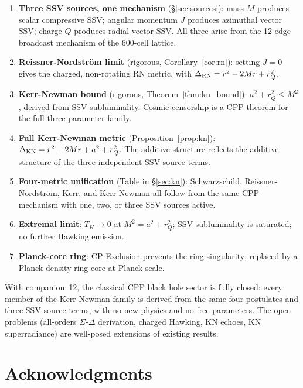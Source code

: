 \documentclass[12pt]{article}
\newcommand{\rQ}{r_Q}
\newcommand{\Dlt}{\Delta}
\begin{document}
\begin{enumerate}
  \item \textbf{Three SSV sources, one mechanism} (§\ref{sec:sources}):
    mass $M$ produces scalar compressive SSV; angular momentum $J$
    produces azimuthal vector SSV; charge $Q$ produces radial vector
    SSV.  All three arise from the 12-edge broadcast mechanism of the
    600-cell lattice.

  \item \textbf{Reissner-Nordström limit} (rigorous,
    Corollary~\ref{cor:rn}): setting $J = 0$ gives the charged,
    non-rotating RN metric, with $\Dlt_{\rm RN} = r^2 - 2Mr + \rQ^2$.

  \item \textbf{Kerr-Newman bound} (rigorous,
    Theorem~\ref{thm:kn_bound}): $a^2 + \rQ^2 \leq M^2$, derived from
    SSV subluminality.  Cosmic censorship is a CPP theorem for the
    full three-parameter family.

  \item \textbf{Full Kerr-Newman metric}
    (Proposition~\ref{prop:kn}): $\Dlt_{\rm KN} = r^2 - 2Mr + a^2
    + \rQ^2$.  The additive structure reflects the additive structure
    of the three independent SSV source terms.

  \item \textbf{Four-metric unification} (Table in §\ref{sec:kn}):
    Schwarzschild, Reissner-Nordström, Kerr, and Kerr-Newman all
    follow from the same CPP mechanism with one, two, or three SSV
    sources active.

  \item \textbf{Extremal limit}: $T_H \to 0$ at $M^2 = a^2 + \rQ^2$;
    SSV subluminality is saturated; no further Hawking emission.

  \item \textbf{Planck-core ring}: CP Exclusion prevents the ring
    singularity; replaced by a Planck-density ring core at Planck scale.
\end{enumerate}

With companion~12, the classical CPP black hole sector is fully
closed: every member of the Kerr-Newman family is derived from the
same four postulates and three SSV source terms, with no new physics
and no free parameters.  The open problems (all-orders $\Sigma$-$\Delta$
derivation, charged Hawking, KN echoes, KN superradiance) are
well-posed extensions of existing results.

\section*{Acknowledgments}
\end{document}

